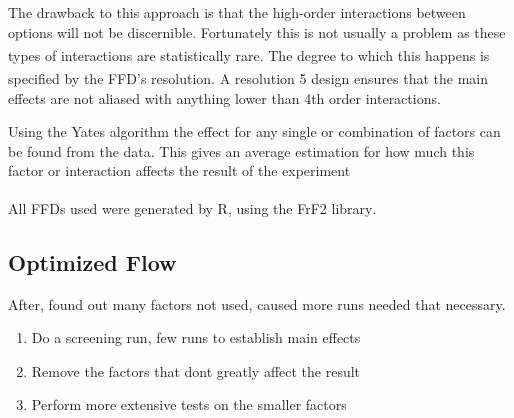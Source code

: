 \documentclass[twocolumn]{article}
\newcommand{\todo}[1]{\textbf{\textcolor{red}{#1}}}
\let\oldcite\cite
\renewcommand{\cite}[1]{\textsuperscript{\oldcite{#1}}}
\begin{document}
The drawback to this approach is that the high-order interactions between options will not be discernible. Fortunately this is not usually a problem as these types of interactions are statistically rare\todo{\cite{REF sparsity of effects?}}. The degree to which this happens is specified by the FFD's resolution\cite{BoxHunter}. A resolution 5 design ensures that the main effects are not aliased with anything lower than 4th order interactions.

Using the Yates algorithm the effect for any single or combination of factors can be found from the data. This gives an average estimation for how much this factor or interaction affects the result of the experiment




All FFDs used were generated by R, using the FrF2 library\cite{FrF2}.

\subsection*{Optimized Flow}

After, found out many factors not used, caused more runs needed that necessary.

\begin{enumerate}
	\item Do a screening run, few runs to establish main effects
	\item Remove the factors that dont greatly affect the result
	\item Perform more extensive tests on the smaller factors
\end{enumerate}
\end{document}
